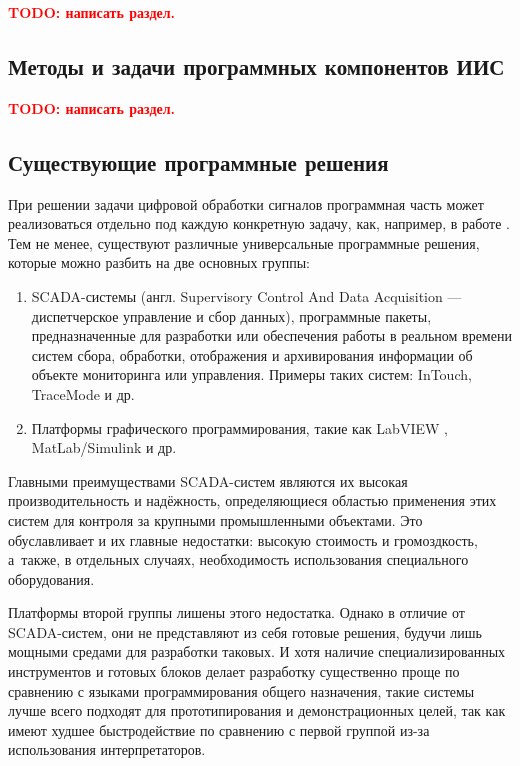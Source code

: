 \documentclass[a4paper, 14pt, titlepage]{extarticle}
\newcommand{\todo}[1]{\textbf{\textcolor{red}{TODO: #1}}}
\begin{document}
  \todo{написать раздел.}

  \subsection{Методы и задачи программных компонентов ИИС}

  \todo{написать раздел.}

  \subsection{Существующие программные решения}\label{ssec:existing}

  При решении задачи цифровой обработки сигналов программная часть может реализоваться отдельно под
  каждую конкретную задачу, как, например, в работе \cite{bak-autometry}.
  Тем не менее, существуют различные универсальные программные решения, которые можно разбить на две
  основных группы:
  \begin{enumerate}
    \item SCADA-системы (англ. Supervisory Control And Data Acquisition — диспетчерское управление и
      сбор данных), программные пакеты, предназначенные для разработки или обеспечения работы в
      реальном времени систем сбора, обработки, отображения и архивирования информации об объекте
      мониторинга или управления. \cite{boyer-scada}
      Примеры таких систем: InTouch, TraceMode и др.
    \item Платформы графического программирования, такие как LabVIEW \cite{lavrov-labview}, MatLab/Simulink и др.
  \end{enumerate}

  Главными преимуществами SCADA-систем являются их высокая производительность и надёжность,
  определяющиеся областью применения этих систем для контроля за крупными промышленными объектами.
  Это обуславливает и их главные недостатки: высокую стоимость и громоздкость, а~также, в отдельных
  случаях, необходимость использования специального оборудования.

  Платформы второй группы лишены этого недостатка. Однако в отличие от SCADA-систем, они не
  представляют из себя готовые решения, будучи лишь мощными средами для разработки таковых.
  И хотя наличие специализированных инструментов и готовых блоков делает разработку существенно
  проще по сравнению с языками программирования общего назначения, такие системы лучше всего
  подходят для прототипирования и демонстрационных целей, так как имеют худшее быстродействие по
  сравнению с первой группой из-за использования интерпретаторов.
\end{document}

